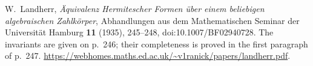W.~Landherr, \emph{\"Aquivalenz Hermitescher Formen \"uber einem
beliebigen algebraischen Zahlk\"orper},
Abhandlungen aus dem Mathematischen Seminar der Universit\"at
Hamburg \textbf{11} (1935), 245--248,
doi:10.1007/BF02940728.
The invariants are given on p.~246; their completeness is proved
in the first paragraph of p.~247.
\url{https://webhomes.maths.ed.ac.uk/~v1ranick/papers/landherr.pdf}.
